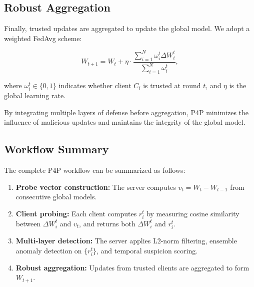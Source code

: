 \subsection{Robust Aggregation}
Finally, trusted updates are aggregated to update the global model. 
We adopt a weighted FedAvg scheme:

\begin{equation}
    W_{t+1} = W_t + \eta \cdot \frac{\sum_{i=1}^N \omega_i^t \Delta W_i^t}{\sum_{i=1}^N \omega_i^t},
\end{equation}

where $\omega_i^t \in \{0,1\}$ indicates whether client $C_i$ is trusted at round $t$, and $\eta$ is the global learning rate. 
\usepackage[ruled,vlined]{algorithm2e}



By integrating multiple layers of defense before aggregation, P4P minimizes the influence of malicious updates and maintains the integrity of the global model.

\subsection{Workflow Summary}
The complete P4P workflow can be summarized as follows:

\begin{enumerate}
    \item \textbf{Probe vector construction:} The server computes $v_t = W_t - W_{t-1}$ from consecutive global models.
    \item \textbf{Client probing:} Each client computes $r_i^t$ by measuring cosine similarity between $\Delta W_i^t$ and $v_t$, and returns both $\Delta W_i^t$ and $r_i^t$.
    \item \textbf{Multi-layer detection:} The server applies L2-norm filtering, ensemble anomaly detection on $\{r_i^t\}$, and temporal suspicion scoring.
    \item \textbf{Robust aggregation:} Updates from trusted clients are aggregated to form $W_{t+1}$.
\end{enumerate}